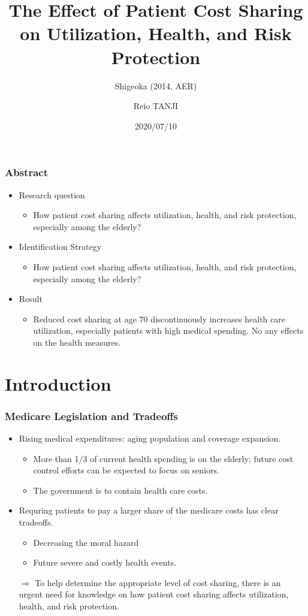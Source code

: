 \documentclass[dvipdfmx,11pt]{beamer}
\title{The Effect of Patient Cost Sharing on Utilization, Health, and Risk Protection}
\subtitle{Shigeoka (2014, AER)}
\author{Reio TANJI}
\date{2020/07/10}
\institute{}
\begin{document}
\begin{frame}\frametitle{}
\titlepage
\end{frame}


\begin{frame}\frametitle{Abstract}
  \begin{itemize}
    \item Research question
    \begin{itemize}
      \item How patient cost sharing affects utilization, health, and risk protection, especially among the elderly?
    \end{itemize}
    \item Identification Strategy
    \begin{itemize}
      \item How patient cost sharing affects utilization, health, and risk protection, especially among the elderly?
    \end{itemize}
    \item Result
    \begin{itemize}
      \item Reduced cost sharing at age 70 discontinuously increases health care utilization, especially patients with high medical spending. No any effects on the health measures.
    \end{itemize}
  \end{itemize}
\end{frame}

\section{Introduction}

\frame{\sectionpage}

\begin{frame}\frametitle{Medicare Legislation and Tradeoffs}
  \begin{itemize}
    \item Rising medical expenditures: aging population and coverage expansion.
    \begin{itemize}
      \item More than 1/3 of current health spending is on the elderly; future cost control efforts can be expected to focus on seniors.
      \item The government is to contain health care costs.
    \end{itemize}
    \item Requring patients to pay a larger share of the medicare costs has clear tradeoffs.
    \begin{itemize}
      \item Decreasing the moral hazard
      \item Future severe and costly health events.
    \end{itemize}
    $\Rightarrow$ To help determine the appropriate level of cost sharing, there is an urgent need for knowledge on how patient cost sharing affects utilization, health, and risk protection.
  \end{itemize}
\end{frame}
\end{document}
